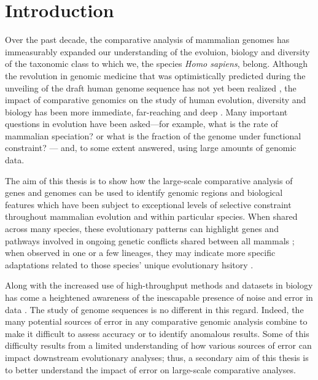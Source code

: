 \chapter{Introduction}\label{ch_intro}

Over the past decade, the comparative analysis of mammalian genomes
has immeasurably expanded our understanding of the evoluion, biology
and diversity of the taxonomic class to which we, the species
\emph{Homo sapiens}, belong. Although the revolution in genomic
medicine that was optimistically predicted during the unveiling of the
draft human genome sequence has not yet been realized
\citep{Collins2001,Varmus2010}, the impact of comparative genomics on
the study of human evolution, diversity and biology has been more
immediate, far-reaching and deep \citep{OBrien1999,Lander2011}. Many
important questions in evolution have been asked---for example, what
is the rate of mammalian speciation?
\citep{BinindaEmonds2007,Venditti2011} or what is the fraction of the
genome under functional constraint?  \citep{Siepel2005,Ponting2011}---
and, to some extent answered, using large amounts of genomic data.

The aim of this thesis is to show how the large-scale comparative
analysis of genes and genomes can be used to identify genomic regions
and biological features which have been subject to exceptional levels
of selective constraint throughout mammalian evolution and within
particular species. When shared across many species, these
evolutionary patterns can highlight genes and pathways involved in
ongoing genetic conflicts shared between all mammals \citep{TODO};
when observed in one or a few lineages, they may indicate more
specific adaptations related to those species' unique evolutionary
hsitory \citep{TODO}.

Along with the increased use of high-throughput methods and datasets
in biology has come a heightened awareness of the inescapable presence
of noise and error in data \citep{TODO}. The study of genome sequences
is no different in this regard. Indeed, the many potential sources of
error in any comparative genomic analysis combine to make it difficult
to assess accuracy or to identify anomalous results. Some of this
difficulty results from a limited understanding of how various sources
of error can impact downstream evolutionary analyses; thus, a
secondary aim of this thesis is to better understand the impact of
error on large-scale comparative analyses.

